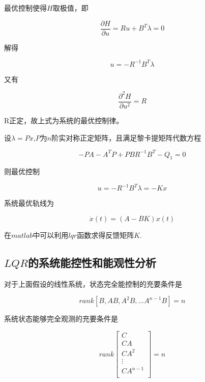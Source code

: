 最优控制使得$H$取极值，即

\begin{equation}
\frac{\partial H}{\partial u}=Ru+B^T\lambda=0
\end{equation}

解得

\begin{equation}
u=-R^{-1}B^T\lambda
\end{equation}

又有

\begin{equation}
\frac{\partial^2 H}{\partial u^2}=R
\end{equation}

R正定，故上式为系统的最优控制律。

设$\lambda=Px$,$P$为$n$阶实对称正定矩阵，且满足黎卡提矩阵代数方程

\begin{equation}
-PA-A^TP+PBR^{-1}B^T-Q_1=0
\end{equation}

则最优控制

\begin{equation}
u=-R^{-1}B^T\lambda=-Kx
\end{equation}

系统最优轨线为

\begin{equation}
\dot x(t)=(A-BK)x(t)
\end{equation}

在$matlab$中可以利用$lqr$函数求得反馈矩阵$K$.

\subsection{$LQR$的系统能控性和能观性分析}

对于上面假设的线性系统，状态完全能控制的充要条件是

\begin{equation}
rank[B,AB,A^2B,\dots A^{n-1}B]=n
\end{equation}

系统状态能够完全观测的充要条件是

\begin{equation}
rank
\begin{bmatrix}
C\\
CA\\
CA^2\\
\vdots\\
CA^{n-1}\\
\end{bmatrix}
=n
\end{equation}

